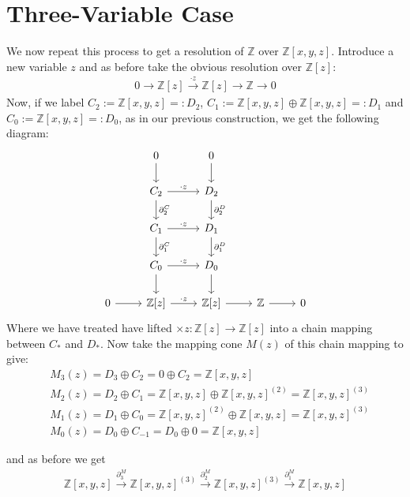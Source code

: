 \documentclass[12pt]{book}
\theoremstyle{definition}
\begin{document}
\section{Three-Variable Case}
We now repeat this process to get a resolution of $\mathbb{Z}$ over $\mathbb{Z}[x,y,z]$. Introduce a new variable $z$ and as before take the obvious resolution over $\mathbb{Z}[z]$: 
\begin{align*}
    0 \rightarrow \mathbb{Z}[z] \xrightarrow{\cdot z} \mathbb{Z}[z] \rightarrow \mathbb{Z} \rightarrow 0 
\end{align*}
Now, if we label $C_2 := \mathbb{Z}[x,y,z] =: D_2$, $C_1 := \mathbb{Z}[x,y,z] \oplus \mathbb{Z}[x,y,z] =: D_1$ and $C_0 := \mathbb{Z}[x,y,z] =: D_0$, as in our previous construction, we get the following diagram: 
\[
\begin{tikzcd}
    & 0 \arrow[d] & 0 \arrow[d] &\\
    & C_2 \arrow[d, "\partial^C_2"] \arrow[r, "\cdot z"] & D_2 \arrow[d, "\partial^D_2"]\\ 
    & C_1  \arrow[d, "\partial^C_1"] \arrow[r, "\cdot z"] & D_1 \arrow[d, "\partial^D_1"] &\\
    & C_0  \arrow[d] \arrow[r, "\cdot z"] & D_0 \arrow[d] &\\
    0 \arrow[r] & \mathbb{Z}[z] \arrow[r, "\cdot z"] & \mathbb{Z}[z] \arrow[r] & \mathbb{Z} \arrow[r] & 0
\end{tikzcd}
\]
Where we have treated have lifted $\times z : \mathbb{Z}[z] \to \mathbb{Z}[z]$ into a chain mapping between $C_*$ and $D_*$. Now take the mapping cone $M(z)$ of this chain mapping to give: 
\begin{align*}
    &M_3(z) = D_3 \oplus C_2 = 0 \oplus C_2 = \mathbb{Z}[x,y,z]\\
    &M_2(z) = D_2 \oplus C_1 = \mathbb{Z}[x,y,z] \oplus \mathbb{Z}[x,y,z]^{(2)} = \mathbb{Z}[x,y,z]^{(3)}\\
    &M_1(z) = D_1 \oplus C_0 = \mathbb{Z}[x,y,z]^{(2)} \oplus \mathbb{Z}[x,y,z] = \mathbb{Z}[x,y,z]^{(3)}\\
    &M_0(z) = D_0 \oplus C_{-1} = D_0 \oplus 0 = \mathbb{Z}[x,y,z]
\end{align*}

and as before we get 
\begin{align*}
    \mathbb{Z}[x,y,z] \xrightarrow{\partial^M_3} \mathbb{Z}[x,y,z]^{(3)} \xrightarrow{\partial^M_2} \mathbb{Z}[x,y,z]^{(3)} \xrightarrow{\partial^M_1} \mathbb{Z}[x,y,z]
\end{align*}
\end{document}
